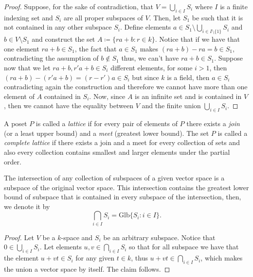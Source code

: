 \begin{proof}
    Suppose, for the sake of contradiction, that \(V = \bigcup_{i \in  I} S_i\)
    where \(I\) is a finite indexing set and \(S_i\) are all proper subspaces of
    \(V\). Then, let \(S_1\) be such that it is not contained in any other
    subspace \(S_i\). Define elements \(a \in S_1 \setminus \bigcup_{i \in
        I \setminus \{1\} } S_i \) and \(b \in V \setminus S_1\) and construct the
    set \(A \coloneq \{ra + b \colon r \in k\}\). Notice that if we have that one element
    \(ra + b \in S_1\), the fact that \(a \in S_1\) makes \((ra + b) - ra = b
    \in S_1\), contradicting the assumption of \(b \not\in S_1\) thus, we can't
    have \(ra + b \in S_1\). Suppose now that we let \(ra + b, r'a + b \in S_i\)
    different elements, for some \(i > 1\), then \((ra + b) - (r'a + b) = (r -
    r')a \in S_i\) but since \(k\) is a field, then \(a \in S_i\) contradicting
    again the construction and therefore we cannot have more than one element of
    \(A\) contained in \(S_i\). Now, since \(A\) is an infinite set and is
    contained in \(V\), then we cannot have the equality between \(V\) and the
    finite union \(\bigcup_{i \in  I} S_i\).
\end{proof}

\begin{definition}[Lattice]\label{def: lattice}
    A poset \(P\) is called a \emph{lattice} if for every pair of
    elements of \(P\) there exists a \emph{join} (or a least upper bound) and a
    \emph{meet} (greatest lower bound). The set \(P\) is called a \emph{complete
        lattice} if there exists a join and a meet for every collection of sets and
    also every collection contains smallest and larger elements under the partial
    order.
\end{definition}

\begin{proposition}\label{prop: intersection of subspaces}
    The intersection of any collection of subspaces of a given vector space is a
    subspace of the original vector space. This intersection contains the
    greatest lower bound of subspace that is contained in every subspace of the
    intersection, then, we denote it by
    \[
        \bigcap_{i \in  I} S_i = \mathrm{Glb}\{S_i \colon i \in I\}.
    \]
\end{proposition}

\begin{proof}
    Let \(V\) be a \(k\)-space and \(S_i\) be an arbitrary subspace. Notice that
    \(0 \in \bigcup_{i \in  I} S_i\). Let elements \(u, v \in \bigcap_{i \in  I}
    S_i\) so that for all subspace we have that the element \(u + vt \in S_i\)
    for any given \(t \in k\), thus \(u + vt \in \bigcap_{i \in  I} S_i\), which
    makes the union a vector space by itself. The claim follows.
\end{proof}

